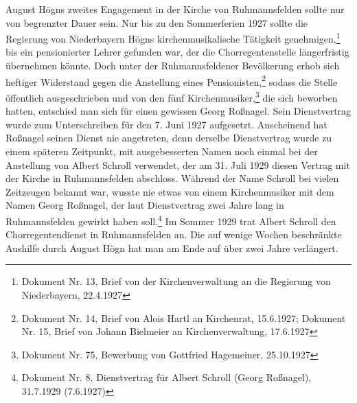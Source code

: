 \documentclass[a4paper]{article}
\begin{document}
August Högns zweites Engagement in der Kirche von Ruhmannsfelden sollte
nur von begrenzter Dauer sein. Nur bis zu den Sommerferien 1927 sollte
die Regierung von Niederbayern Högns kirchenmusikalische Tätigkeit
genehmigen,\footnote{ Dokument Nr. 13, Brief von der Kirchenverwaltung
an die Regierung von Niederbayern, 22.4.1927} bis ein pensionierter
Lehrer gefunden war, der die Chorregentenstelle längerfristig
übernehmen könnte. Doch unter der Ruhmannsfeldener Bevölkerung erhob
sich heftiger Widerstand gegen die Anstellung eines
Pensionisten,\footnote{ Dokument Nr. 14, Brief von Alois Hartl an
Kirchenrat, 15.6.1927; Dokument Nr. 15, Brief von Johann Bielmeier an
Kirchenverwaltung, 17.6.1927} sodass die Stelle öffentlich
ausgeschrieben und von den fünf Kirchenmusiker,\footnote{ Dokument Nr.
75, Bewerbung von Gottfried Hagemeiner, 25.10.1927} die sich beworben
hatten, entschied man sich für einen gewissen Georg Roßnagel. Sein
Dienstvertrag wurde zum Unterschreiben für den 7. Juni 1927 aufgesetzt.
Anscheinend hat Roßnagel seinen Dienst nie angetreten, denn derselbe
Dienstvertrag wurde zu einem späteren Zeitpunkt, mit ausgebesserten
Namen noch einmal bei der Anstellung von Albert Schroll verwendet, der
am 31. Juli 1929 diesen Vertrag mit der Kirche in Ruhmannsfelden
abschloss. Während der Name Schroll bei vielen Zeitzeugen bekannt war,
wusste nie etwas von einem Kirchenmusiker mit dem Namen Georg Roßnagel,
der laut Dienstvertrag zwei Jahre lang in Ruhmannsfelden gewirkt haben
soll.\footnote{ Dokument Nr. 8, Dienstvertrag für Albert Schroll (Georg
Roßnagel), 31.7.1929 (7.6.1927)} Im Sommer 1929 trat Albert Schroll den
Chorregentendienst in Ruhmannsfelden an. Die auf wenige Wochen
beschränkte Aushilfe durch August Högn hat man am Ende auf über zwei
Jahre verlängert.
\end{document}
